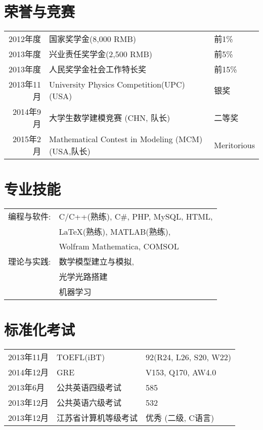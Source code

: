 \documentclass[CHN]{Sketch}
\begin{document}
\section{荣誉与竞赛}
\begin{tabular}{rll}
    \textsc{2012年度} & 国家奖学金\footnotesize(8,000 \textsc{RMB})\normalsize & 前1\%\\
    \textsc{2013年度} & 兴业责任奖学金\footnotesize(2,500 \textsc{RMB})\normalsize & 前5\%\\
    \textsc{2013年度} & 人民奖学金社会工作特长奖 & 前15\%\\
    \textsc{2013年11月} & University Physics Competition(UPC) \footnotesize (USA) \normalsize & 银奖 \\
    \textsc{2014年9月} & 大学生数学建模竞赛 \footnotesize (CHN, 队长) \normalsize & 二等奖 \\
     \textsc{2015年2月} & Mathematical Contest in Modeling (MCM)    \footnotesize (USA,队长) \normalsize &  Meritorious\\
\end{tabular}

\section{专业技能}
\begin{tabular}{rl}
 \textsc{编程与软件:}&C/C++(熟练), C\#, PHP, MySQL, HTML, \\& \LaTeX (熟练), MATLAB(熟练),\\ & Wolfram Mathematica, COMSOL\\
\textsc{理论与实践:}&数学模型建立与模拟, \\&光学光路搭建\\&机器学习\\
\end{tabular}

\section{标准化考试}
\begin{tabular}{l|ll}
 \textsc{2013年11月} & TOEFL(iBT) & 92(R24, L26, S20, W22) \\
 \textsc{2014年12月} & GRE & V153, Q170, AW4.0 \\
 \textsc{2013年6月} & 公共英语四级考试 & 585 \\
 \textsc{2013年12月} & 公共英语六级考试 & 532 \\
 \textsc{2013年12月} & 江苏省计算机等级考试 & 优秀 (二级, C语言) \\
\end{tabular}

\clearpage
\end{document}
